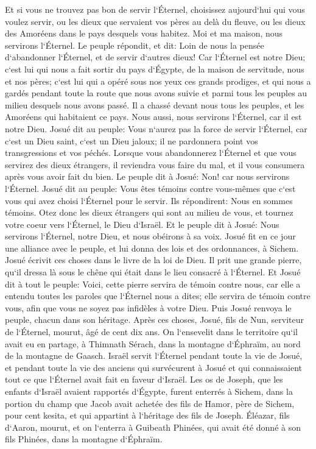 \verse Et si vous ne trouvez pas bon de servir l`Éternel, choisissez aujourd`hui qui vous voulez servir, ou les dieux que servaient vos pères au delà du fleuve, ou les dieux des Amoréens dans le pays desquels vous habitez. Moi et ma maison, nous servirons l`Éternel. 
\verse Le peuple répondit, et dit: Loin de nous la pensée d`abandonner l`Éternel, et de servir d`autres dieux! 
\verse Car l`Éternel est notre Dieu; c`est lui qui nous a fait sortir du pays d`Égypte, de la maison de servitude, nous et nos pères; c`est lui qui a opéré sous nos yeux ces grands prodiges, et qui nous a gardés pendant toute la route que nous avons suivie et parmi tous les peuples au milieu desquels nous avons passé. 
\verse Il a chassé devant nous tous les peuples, et les Amoréens qui habitaient ce pays. Nous aussi, nous servirons l`Éternel, car il est notre Dieu. 
\verse Josué dit au peuple: Vous n`aurez pas la force de servir l`Éternel, car c`est un Dieu saint, c`est un Dieu jaloux; il ne pardonnera point vos transgressions et vos péchés. 
\verse Lorsque vous abandonnerez l`Éternel et que vous servirez des dieux étrangers, il reviendra vous faire du mal, et il vous consumera après vous avoir fait du bien. 
\verse Le peuple dit à Josué: Non! car nous servirons l`Éternel. 
\verse Josué dit au peuple: Vous êtes témoins contre vous-mêmes que c`est vous qui avez choisi l`Éternel pour le servir. Ils répondirent: Nous en sommes témoins. 
\verse Otez donc les dieux étrangers qui sont au milieu de vous, et tournez votre coeur vers l`Éternel, le Dieu d`Israël. 
\verse Et le peuple dit à Josué: Nous servirons l`Éternel, notre Dieu, et nous obéirons à sa voix. 
\verse Josué fit en ce jour une alliance avec le peuple, et lui donna des lois et des ordonnances, à Sichem. 
\verse Josué écrivit ces choses dans le livre de la loi de Dieu. Il prit une grande pierre, qu`il dressa là sous le chêne qui était dans le lieu consacré à l`Éternel. 
\verse Et Josué dit à tout le peuple: Voici, cette pierre servira de témoin contre nous, car elle a entendu toutes les paroles que l`Éternel nous a dites; elle servira de témoin contre vous, afin que vous ne soyez pas infidèles à votre Dieu. 
\verse Puis Josué renvoya le peuple, chacun dans son héritage. 
\verse Après ces choses, Josué, fils de Nun, serviteur de l`Éternel, mourut, âgé de cent dix ans. 
\verse On l`ensevelit dans le territoire qu`il avait eu en partage, à Thimnath Sérach, dans la montagne d`Éphraïm, au nord de la montagne de Gaasch. 
\verse Israël servit l`Éternel pendant toute la vie de Josué, et pendant toute la vie des anciens qui survécurent à Josué et qui connaissaient tout ce que l`Éternel avait fait en faveur d`Israël. 
\verse Les os de Joseph, que les enfants d`Israël avaient rapportés d`Égypte, furent enterrés à Sichem, dans la portion du champ que Jacob avait achetée des fils de Hamor, père de Sichem, pour cent kesita, et qui appartint à l`héritage des fils de Joseph. 
\verse Éléazar, fils d`Aaron, mourut, et on l`enterra à Guibeath Phinées, qui avait été donné à son fils Phinées, dans la montagne d`Éphraïm. 
